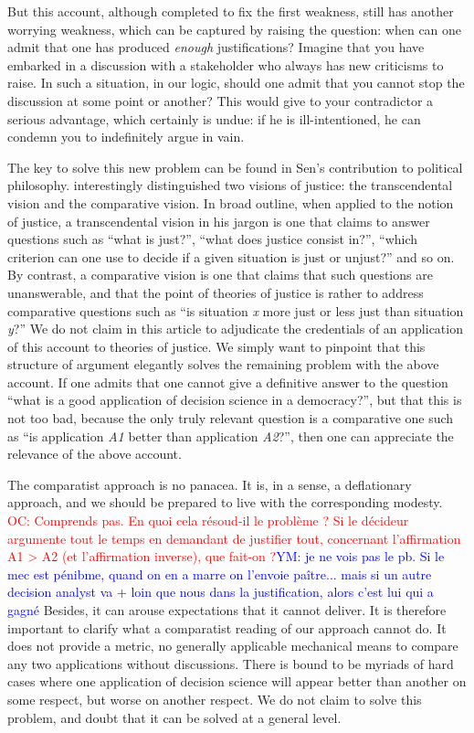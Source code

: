 \documentclass[preprint, french, english, 11pt]{elsarticle}%
\newcommand{\commentYM}[1]{\textcolor{blue}{YM: #1}}
\newcommand{\commentOC}[1]{\textcolor{red}{OC: #1}}
\begin{document}
But this account, although completed to fix the first weakness, still has another worrying weakness, which can be captured by raising the question: when can one admit that one has produced \emph{enough} justifications? Imagine that you have embarked in a discussion with a stakeholder who always has new criticisms to raise. In such a situation, in our logic, should one admit that you cannot stop the discussion at some point or another? This would give to your contradictor a serious advantage, which certainly is undue: if he is ill-intentioned, he can condemn you to indefinitely argue in vain.

The key to solve this new problem can be found in Sen's contribution to political philosophy. \cite{sen_idea_2009} interestingly distinguished two visions of justice: the transcendental vision and the comparative vision. In broad outline, when applied to the notion of justice, a transcendental vision in his jargon is one that claims to answer questions such as ``what is just?'', ``what does justice consist in?'', ``which criterion can one use to decide if a given situation is just or unjust?'' and so on. By contrast, a comparative vision is one that claims that such questions are unanswerable, and that the point of theories of justice is rather to address comparative questions such as ``is situation \emph{x} more just or less just than situation \emph{y}?'' We do not claim in this article to adjudicate the credentials of an application of this account to theories of justice. We simply want to pinpoint that this structure of argument elegantly solves the remaining problem with the above account. If one admits that one cannot give a definitive answer to the question ``what is a good application of decision science in a democracy?'', but that this is not too bad, because the only truly relevant question is a comparative one such as ``is application \emph{A1} better than application \emph{A2}?'', then one can appreciate the relevance of the above account.

The comparatist approach is no panacea. It is, in a sense, a deflationary approach, and we should be prepared to live with the corresponding modesty. 
\commentOC{Comprends pas. En quoi cela résoud-il le problème ? Si le décideur argumente tout le temps en demandant de justifier tout, concernant l’affirmation A1 > A2 (et l’affirmation inverse), que fait-on ?}\commentYM{je ne vois pas le pb. Si le mec est pénibme, quand on en a marre on l'envoie paître... mais si un autre decision analyst va + loin que nous dans la justification, alors c'est lui qui a gagné}
Besides, it can arouse expectations that it cannot deliver. It is therefore important to clarify what a comparatist reading of our approach cannot do. It does not provide a metric, no generally applicable mechanical means to compare any two applications without discussions. There is bound to be myriads of hard cases where one application of decision science will appear better than another on some respect, but worse on another respect. We do not claim to solve this problem, and doubt that it can be solved at a general level.
\end{document}
